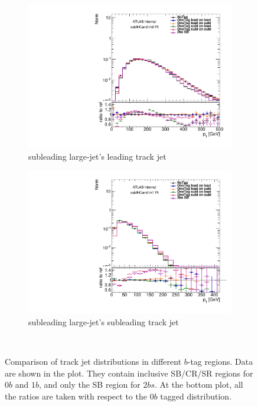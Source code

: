 \begin{figure}[htbp!]
    \begin{subfigure}[b]{0.4\textwidth}
        \includegraphics[width=\textwidth,angle=-90]{figures/boosted/Prereweight/2bs_directcompare_sublHCand_trk0_Pt_1.pdf}
        \caption{subleading large-\R jet's leading track jet \pt}
        \label{fig:rw-2bs-comp-subl0}
    \end{subfigure}
    \quad \quad 
    \begin{subfigure}[b]{0.4\textwidth}
        \includegraphics[width=\textwidth,angle=-90]{figures/boosted/Prereweight/2bs_directcompare_sublHCand_trk1_Pt_1.pdf}
        \caption{subleading large-\R jet's subleading track jet \pt}
        \label{fig:rw-2bs-comp-subl1}
    \end{subfigure} \\ 
   \caption{
   Comparison of track jet \pt distributions in different $b$-tag regions. Data are shown in the plot. They contain inclusive SB/CR/SR regions for $0b$ and $1b$, and only the SB region for $2bs$. At the bottom plot, all the ratios are taken with respect to the $0b$ tagged distribution.}
  \label{fig:rw-2bs-comp}
\end{figure}

